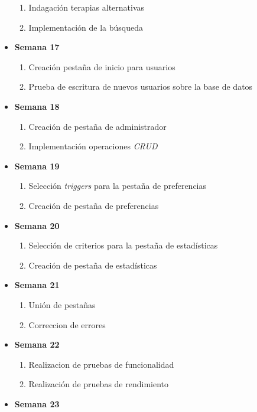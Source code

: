 \documentclass[a4paper,12pt,twoside]{memoir}
\begin{document}
\begin{itemize}
\begin{enumerate}
        \item Indagación terapias alternativas
        \item Implementación de la búsqueda
    \end{enumerate}
    \item \textbf{Semana 17}
    \begin{enumerate}
        \item Creación pestaña de inicio para usuarios
        \item Prueba de escritura de nuevos usuarios sobre la base de datos
    \end{enumerate}
    \item \textbf{Semana 18}
    \begin{enumerate}
        \item Creación de pestaña de administrador
        \item Implementación operaciones \textit{CRUD}
    \end{enumerate}
    \item \textbf{Semana 19}
    \begin{enumerate}
        \item Selección \textit{triggers} para la pestaña de preferencias
        \item Creación de pestaña de preferencias
    \end{enumerate}
    \item \textbf{Semana 20}
    \begin{enumerate}
        \item Selección de criterios para la pestaña de estadísticas
        \item Creación de pestaña de estadísticas
    \end{enumerate}
    \item \textbf{Semana 21}
    \begin{enumerate}
        \item Unión de pestañas 
        \item Correccion de errores
    \end{enumerate}
    \item \textbf{Semana 22}
    \begin{enumerate}
        \item Realizacion de pruebas de funcionalidad
        \item Realización de pruebas de rendimiento
    \end{enumerate}
    \item \textbf{Semana 23}
    \begin{enumerate}

\end{enumerate}
\end{itemize}
\end{document}
